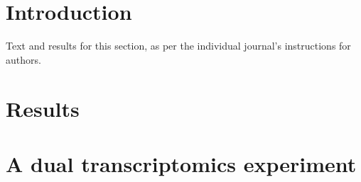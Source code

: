 \documentclass{bmcart}
\begin{document}



\section*{Introduction}
Text and results for this section, as per the individual journal's instructions for authors. 


  \section*{Results}


  \section*{A dual transcriptomics experiment}
\end{document}
